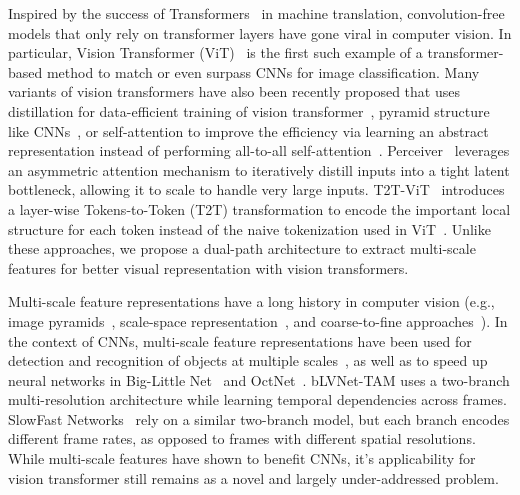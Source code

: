 \documentclass[10pt,twocolumn,letterpaper]{article}
\newcommand{\myparagraph}[1]{\vspace{1mm} \noindent {\textbf{#1}}}
\begin{document}
\myparagraph{Vision Transformer.} Inspired by the success of Transformers~\cite{Transformer_NIPS2017_Vaswani} in machine translation, convolution-free models that only rely on transformer layers have gone viral in computer vision. In particular, Vision Transformer (ViT)~\cite{ViT_dosovitskiy2021an} is the first such example of a transformer-based method to match or even surpass CNNs for image classification. Many variants of vision transformers have also been recently proposed that uses distillation for data-efficient training of vision transformer~\cite{DeiT_touvron2020}, pyramid structure like CNNs~\cite{PVT_wang2021}, or self-attention to improve the efficiency via learning an abstract representation instead of performing all-to-all self-attention~\cite{centroidvit_wu2021}. Perceiver~\cite{perceiver_jaegle2021} leverages an asymmetric attention mechanism to iteratively distill inputs into a tight latent bottleneck, allowing it to scale to handle very large inputs. T2T-ViT~\cite{tokenstotoken_yuan2021} introduces a layer-wise Tokens-to-Token (T2T) transformation to encode the important local structure for each token instead of the naive tokenization used in ViT~\cite{ViT_dosovitskiy2021an}.
Unlike these approaches, we propose a dual-path architecture to extract multi-scale features for better visual representation with vision transformers.



\myparagraph{Multi-Scale CNNs.} Multi-scale feature representations have a long  history in computer vision (e.g., image pyramids~\cite{adelson1984pyramid}, scale-space representation~\cite{perona1990scale}, and coarse-to-fine approaches~\cite{pedersoli2015coarse}).
In the context of CNNs, multi-scale feature representations have been used for detection and recognition of objects at multiple scales~\cite{cai2016unified,lin2017feature,yang2015multi,newell2016stacked}, as well as to speed up neural networks in Big-Little Net~\cite{chen2018big} and OctNet~\cite{chen2019drop}. bLVNet-TAM \cite{fan2019more} uses a two-branch multi-resolution architecture while learning temporal dependencies across frames. SlowFast Networks~\cite{feichtenhofer2019slowfast} rely on a similar two-branch model, but each branch encodes different frame rates, as opposed to frames with different spatial resolutions. While multi-scale features have shown to benefit CNNs, it's applicability for vision transformer still remains as a novel and largely under-addressed problem. 
\end{document}
